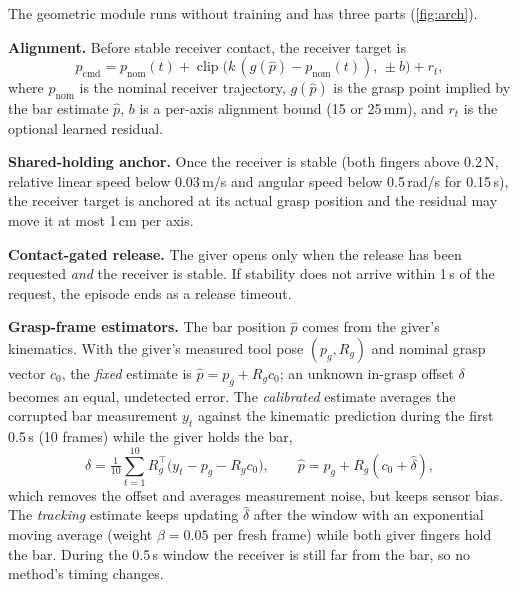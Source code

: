 \documentclass[conference,letterpaper]{IEEEtran}
\begin{document}
The geometric module runs without training and has three parts (\cref{fig:arch}).

\textbf{Alignment.} Before stable receiver contact, the receiver target is
\begin{equation}
p_{\text{cmd}} = p_{\text{nom}}(t) + \operatorname{clip}\!\big(k\,(g(\hat p) - p_{\text{nom}}(t)),\,\pm b\big) + r_t,
\label{eq:align}
\end{equation}
where $p_{\text{nom}}$ is the nominal receiver trajectory, $g(\hat p)$ is the grasp point implied by the bar estimate
$\hat p$, $b$ is a per-axis alignment bound (15 or 25\,mm), and $r_t$ is the optional learned residual.

\textbf{Shared-holding anchor.} Once the receiver is stable (both fingers above 0.2\,N, relative linear speed below
0.03\,m/s and angular speed below 0.5\,rad/s for 0.15\,s), the receiver target is anchored at its actual grasp
position and the residual may move it at most 1\,cm per axis.

\textbf{Contact-gated release.} The giver opens only when the release has been requested \emph{and} the receiver is
stable. If stability does not arrive within 1\,s of the request, the episode ends as a release timeout.

\textbf{Grasp-frame estimators.} The bar position $\hat p$ comes from the giver's kinematics. With the giver's
measured tool pose $(p_g, R_g)$ and nominal grasp vector $c_0$, the \emph{fixed} estimate is
$\hat p = p_g + R_g c_0$; an unknown in-grasp offset $\delta$ becomes an equal, undetected error. The
\emph{calibrated} estimate averages the corrupted bar measurement $y_t$ against the kinematic prediction during the
first 0.5\,s (10 frames) while the giver holds the bar,
\begin{equation}
\hat\delta = \tfrac{1}{10}\textstyle\sum_{t=1}^{10} R_g^{\top}\big(y_t - p_g - R_g c_0\big),\qquad
\hat p = p_g + R_g (c_0 + \hat\delta),
\end{equation}
which removes the offset and averages measurement noise, but keeps sensor bias. The \emph{tracking} estimate keeps
updating $\hat\delta$ after the window with an exponential moving average (weight $\beta = 0.05$ per fresh frame)
while both giver fingers hold the bar. During the 0.5\,s window the receiver is still far from the bar, so no
method's timing changes.
\end{document}
